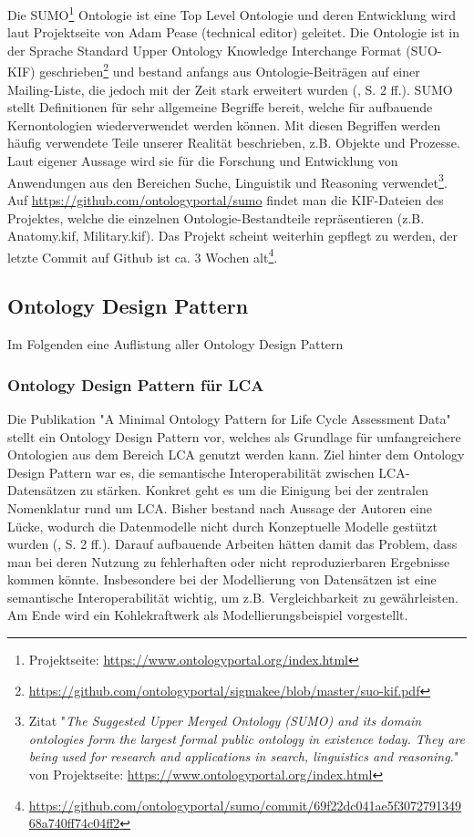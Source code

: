 \documentclass{article}
\begin{document}
Die SUMO\footnote{Projektseite: \url{https://www.ontologyportal.org/index.html}} Ontologie ist eine Top Level Ontologie und deren Entwicklung wird laut Projektseite von Adam Pease (technical editor) geleitet.
Die Ontologie ist in der Sprache Standard Upper Ontology Knowledge Interchange Format (SUO-KIF) geschrieben\footnote{\url{https://github.com/ontologyportal/sigmakee/blob/master/suo-kif.pdf}} und
bestand anfangs aus Ontologie-Beiträgen auf einer Mailing-Liste, die jedoch mit der Zeit stark erweitert wurden (\cite{niles2001towards}, S. 2 ff.).
SUMO stellt Definitionen für sehr allgemeine Begriffe bereit, welche für aufbauende Kernontologien wiederverwendet werden können.
Mit diesen Begriffen werden häufig verwendete Teile unserer Realität beschrieben, z.B. Objekte und Prozesse.
Laut eigener Aussage wird sie für die Forschung und Entwicklung von Anwendungen aus den Bereichen Suche, Linguistik und Reasoning verwendet\footnote{Zitat "\textit{The Suggested Upper Merged Ontology (SUMO) and its domain ontologies form the largest formal public ontology in existence today. They are being used for research and applications in search, linguistics and reasoning.}" von Projektseite: \url{https://www.ontologyportal.org/index.html}}.
Auf \url{https://github.com/ontologyportal/sumo} findet man die KIF-Dateien des Projektes, welche die einzelnen Ontologie-Bestandteile repräsentieren (z.B. Anatomy.kif, Military.kif).
Das Projekt scheint weiterhin gepflegt zu werden, der letzte Commit auf Github ist ca. 3 Wochen alt\footnote{\url{https://github.com/ontologyportal/sumo/commit/69f22dc041ae5f307279134968a740ff74c04ff2}}.

\subsection{Ontology Design Pattern}

Im Folgenden eine Auflistung aller Ontology Design Pattern

\subsubsection{Ontology Design Pattern für LCA}


Die Publikation "A Minimal Ontology Pattern for Life Cycle Assessment Data"\cite{vardem2015anminimal} stellt ein Ontology Design Pattern vor, welches als Grundlage für umfangreichere Ontologien aus dem Bereich LCA genutzt werden kann.
Ziel hinter dem Ontology Design Pattern war es, die semantische Interoperabilität zwischen LCA-Datensätzen zu stärken.
Konkret geht es um die Einigung bei der zentralen Nomenklatur rund um LCA.
Bisher bestand nach Aussage der Autoren eine Lücke, wodurch die Datenmodelle nicht durch Konzeptuelle Modelle gestützt wurden (\cite{vardem2015anminimal}, S. 2 ff.).
Darauf aufbauende Arbeiten hätten damit das Problem, dass man bei deren Nutzung zu fehlerhaften oder nicht reproduzierbaren Ergebnisse kommen könnte.
Insbesondere bei der Modellierung von Datensätzen ist eine semantische Interoperabilität wichtig, um z.B. Vergleichbarkeit zu gewährleisten.
Am Ende wird ein Kohlekraftwerk als Modellierungsbeispiel vorgestellt.
\end{document}
